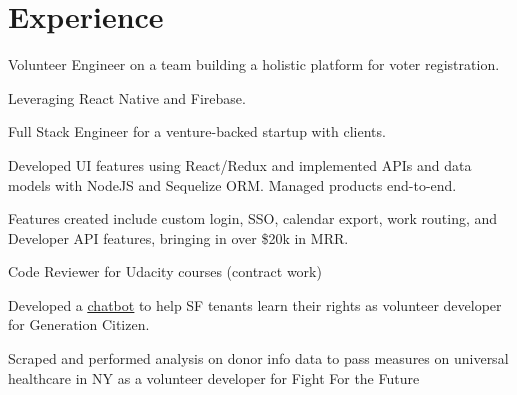 \documentclass[]{deedy-resume-openfont}
\begin{document}
\begin{minipage}[t]{0.66\textwidth}


\section{Experience}

\vspace{\topsep} %
\begin{tightemize}

\item Volunteer Engineer on a team building a holistic platform for voter registration.
\item Leveraging React Native and Firebase.

\end{tightemize}
\sectionsep

\begin{tightemize}

\item Full Stack Engineer for a venture-backed startup with clients.
\item Developed UI features using React/Redux and implemented APIs and data models with NodeJS and Sequelize ORM. Managed products end-to-end.
\item Features created include custom login, SSO, calendar export, work routing, and Developer API features, bringing in over \$20k in MRR.

\end{tightemize}
\sectionsep

\begin{tightemize}

\item Code Reviewer for Udacity courses (contract work)
\item Developed a \color{blue}\underline{\href{https://github.com/rahul-nath/rentbot}{\color{blue}chatbot}} to help SF tenants learn their rights as volunteer developer for Generation Citizen.
\item Scraped and performed analysis on donor info data to pass measures on universal healthcare in NY as a volunteer developer for Fight For the Future
\end{tightemize}
\sectionsep



\end{minipage}
\end{document}
